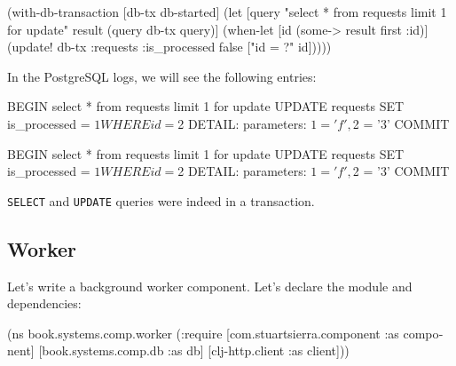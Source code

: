 \else

\begin{english}
  \begin{clojure}
(with-db-transaction
  [db-tx db-started]
  (let [query "select * from requests limit 1 for update"
        result (query db-tx query)]
    (when-let [id (some-> result first :id)]
      (update! db-tx :requests
               {:is_processed false}
               ["id = ?" id]))))
  \end{clojure}
\end{english}

\fi

\noindent
In the PostgreSQL logs, we will see the following entries:


\ifnarrow

\begin{english}
  \begin{sql}
BEGIN
select * from requests
limit 1 for update
UPDATE requests SET is_processed = $1
WHERE id = $2
DETAIL:  parameters: $1 = 'f', $2 = '3'
COMMIT
  \end{sql}
\end{english}

\else

\begin{english}
  \begin{sql}
BEGIN
select * from requests limit 1 for update
UPDATE requests SET is_processed = $1 WHERE id = $2
DETAIL:  parameters: $1 = 'f', $2 = '3'
COMMIT
  \end{sql}
\end{english}

\fi

\noindent
\verb|SELECT| and \verb|UPDATE| queries were indeed in a transaction.

\subsection{Worker}

Let's write a background worker component. Let's declare the module and dependencies:

\ifnarrow

\begin{english}
  \begin{clojure}
(ns book.systems.comp.worker
  (:require
   [com.stuartsierra.component
    :as component]
   [book.systems.comp.db :as db]
   [clj-http.client :as client]))
  \end{clojure}
\end{english}

